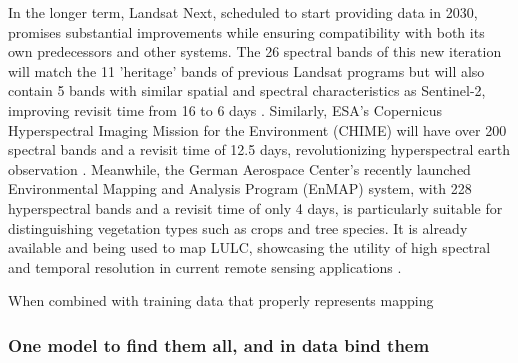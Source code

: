         In the longer term, Landsat Next, scheduled to start providing data in 2030, promises substantial improvements while ensuring compatibility with both its own predecessors and other systems. The 26 spectral bands of this new iteration will match the 11 'heritage' bands of previous Landsat programs but will also contain 5 bands with similar spatial and spectral characteristics as Sentinel-2, improving revisit time from 16 to 6 days \citep{landsatnext2023}. Similarly, ESA's Copernicus Hyperspectral Imaging Mission for the Environment (CHIME) will have over 200 spectral bands and a revisit time of 12.5 days, revolutionizing hyperspectral earth observation \citep{nieke2023copernicus}. Meanwhile, the German Aerospace Center's recently launched Environmental Mapping and Analysis Program (EnMAP) system, with 228 hyperspectral bands and a revisit time of only 4 days, is particularly suitable for distinguishing vegetation types such as crops and tree species. It is already available and being used to map LULC, showcasing the utility of high spectral and temporal resolution in current remote sensing applications \citep{storch2023enmap, lekka2024appraisal}.

    

        When combined with training data that properly represents mapping 

        \subsubsection{One model to find them all, and in data bind them}

        \citep{xu2021towards} %

